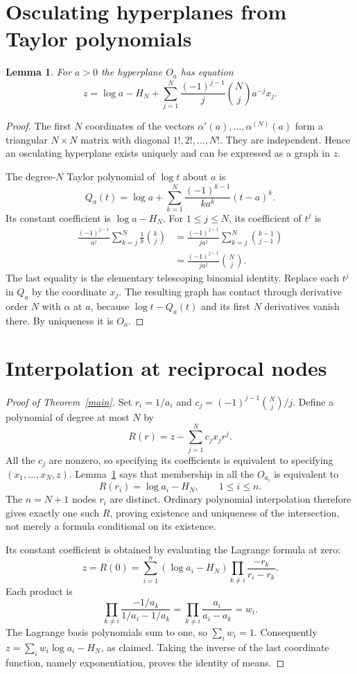 \documentclass[11pt]{article}
\newtheorem{lemma}{Lemma}
\begin{document}
\section{Osculating hyperplanes from Taylor polynomials}
\begin{lemma}\label{plane}
For $a>0$ the hyperplane $O_a$ has equation
\[
 z=\log a-H_N+
 \sum_{j=1}^N\frac{(-1)^{j-1}}{j}\binom Nj a^{-j}x_j.
\]
\end{lemma}
\begin{proof}
The first $N$ coordinates of the vectors
$\alpha'(a),\ldots,\alpha^{(N)}(a)$ form a triangular $N\times N$
matrix with diagonal $1!,2!,\ldots,N!$. They are independent. Hence an
osculating hyperplane exists uniquely and can be expressed as a graph in $z$.

The degree-$N$ Taylor polynomial of $\log t$ about $a$ is
\[
 Q_a(t)=\log a+\sum_{k=1}^N\frac{(-1)^{k-1}}{k a^k}(t-a)^k.
\]
Its constant coefficient is $\log a-H_N$. For $1\leq j\leq N$,
its coefficient of $t^j$ is
\begin{align*}
 \frac{(-1)^{j-1}}{a^j}\sum_{k=j}^N\frac1k\binom kj
 &=\frac{(-1)^{j-1}}{j a^j}\sum_{k=j}^N\binom{k-1}{j-1}\\
 &=\frac{(-1)^{j-1}}{j a^j}\binom Nj.
\end{align*}
The last equality is the elementary telescoping binomial identity.
Replace each $t^j$ in $Q_a$ by the coordinate $x_j$. The resulting graph
has contact through derivative order $N$ with $\alpha$ at $a$, because
$\log t-Q_a(t)$ and its first $N$ derivatives vanish there.
By uniqueness it is $O_a$.
\end{proof}

\section{Interpolation at reciprocal nodes}
\begin{proof}[Proof of Theorem~\ref{main}]
Set $r_i=1/a_i$ and $c_j=(-1)^{j-1}\binom Nj/j$. Define a polynomial
of degree at most $N$ by
\[
 R(r)=z-\sum_{j=1}^N c_j x_j r^j.
\]
All the $c_j$ are nonzero, so specifying its coefficients is equivalent to
specifying $(x_1,\ldots,x_N,z)$. Lemma~\ref{plane} says that membership in
all the $O_{a_i}$ is equivalent to
\[
 R(r_i)=\log a_i-H_N,\qquad 1\leq i\leq n.
\]
The $n=N+1$ nodes $r_i$ are distinct. Ordinary polynomial interpolation
therefore gives exactly one such $R$, proving existence and uniqueness
of the intersection, not merely a formula conditional on its existence.

Its constant coefficient is obtained by evaluating the Lagrange formula
at zero:
\[
 z=R(0)=\sum_{i=1}^n(\log a_i-H_N)
 \prod_{k\ne i}\frac{-r_k}{r_i-r_k}.
\]
Each product is
\[
 \prod_{k\ne i}\frac{-1/a_k}{1/a_i-1/a_k}
 =\prod_{k\ne i}\frac{a_i}{a_i-a_k}=w_i.
\]
The Lagrange basis polynomials sum to one, so $\sum_iw_i=1$.
Consequently $z=\sum_iw_i\log a_i-H_N$, as claimed.
Taking the inverse of the last coordinate function, namely exponentiation,
proves the identity of means.
\end{proof}
\end{document}
